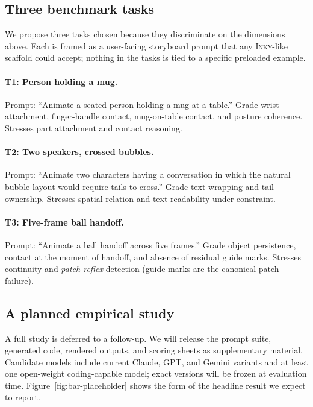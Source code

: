 \documentclass[10pt,twocolumn]{article}
\newcommand{\term}[1]{\textit{#1}}
\newcommand{\inky}{\textsc{Inky}}
\begin{document}
\subsection{Three benchmark tasks}

We propose three tasks chosen because they discriminate on the
dimensions above. Each is framed as a user-facing storyboard
prompt that any \inky{}-like scaffold could accept; nothing in
the tasks is tied to a specific preloaded example.

\paragraph{T1: Person holding a mug.} Prompt: ``Animate a seated
person holding a mug at a table.'' Grade wrist attachment,
finger-handle contact, mug-on-table contact, and posture
coherence. Stresses part attachment and contact reasoning.

\paragraph{T2: Two speakers, crossed bubbles.} Prompt:
``Animate two characters having a conversation in which the
natural bubble layout would require tails to cross.'' Grade text
wrapping and tail ownership. Stresses spatial relation and text
readability under constraint.

\paragraph{T3: Five-frame ball handoff.} Prompt: ``Animate a
ball handoff across five frames.'' Grade object persistence,
contact at the moment of handoff, and absence of residual guide
marks. Stresses continuity and \term{patch reflex} detection
(guide marks are the canonical patch failure).

\subsection{A planned empirical study}

A full study is deferred to a follow-up. We will release the prompt
suite, generated code, rendered outputs, and scoring sheets as
supplementary material. Candidate models include current Claude, GPT,
and Gemini variants and at least one open-weight coding-capable
model; exact versions will be frozen at evaluation time.
Figure~\ref{fig:bar-placeholder} shows the form of the headline
result we expect to report.
\end{document}
